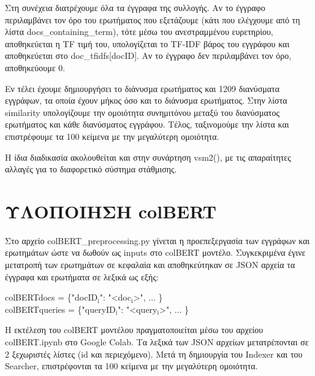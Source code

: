 ﻿\documentclass[12pt]{report}
\begin{document}
            Στη συνέχεια διατρέχουμε όλα τα έγγραφα της συλλογής. Αν το έγγραφο περιλαμβάνει τον όρο του ερωτήματος που εξετάζουμε (κάτι που ελέγχουμε από τη λίστα {\fontCode\small docs\_containing\_term}),
            τότε μέσω του ανεστραμμένου ευρετηρίου, αποθηκεύεται η TF τιμή του, υπολογίζεται το TF-IDF βάρος του εγγράφου και αποθηκεύεται στο {\fontCode\small doc\_tfidfs[docID]}.
            Αν το έγγραφο δεν περιλαμβάνει τον όρο, αποθηκεύουμε 0.

            \begin{graycomment}
                \fontCode\footnotesize doc\_ifidf\(_{\textit{\fontCode\hspace{2pt}len(doc\_collection)}}}\)\ = \{'000001': [0, 0, 0.0, 1.76, 1.5]_{\textit{\fontCode len(query)}}} \(\ldots\)\}
            \end{graycomment}

            Εν τέλει έχουμε δημιουργήσει το διάνυσμα ερωτήματος και 1209 διανύσματα εγγράφων, τα οποία έχουν μήκος όσο και το διάνυσμα ερωτήματος. Στην λίστα {\fontCode\small similarity}
            υπολογίζουμε την ομοιότητα συνημιτόνου μεταξύ του διανύσματος ερωτήματος και κάθε διανύσματος εγγράφου. Τέλος, ταξινομούμε την λίστα και επιστρέφουμε τα 100 κείμενα με την μεγαλύτερη ομοιότητα.

            Η ίδια διαδικασία ακολουθείται και στην συνάρτηση {\fontCode\small vsm2()}, με τις απαραίτητες αλλαγές για το διαφορετικό σύστημα στάθμισης.

        \section{ΥΛΟΠΟΙΗΣΗ colBERT}

            Στο αρχείο {\fontCode\small colBERT\_preprocessing.py} γίνεται η προεπεξεργασία των εγγράφων και ερωτημάτων ώστε να δωθούν ως inputs στο colBERT μοντέλο.
            Συγκεκριμένα έγινε μετατροπή των ερωτημάτων σε κεφαλαία και αποθηκεύτηκαν σε JSON αρχεία τα έγγραφα και ερωτήματα σε λεξικά ως εξής:

            \begin{graycomment}
                \fontCode\footnotesize colBERTdocs = \{"docID\(_\text{i}\)": "<doc\(_\text{i}\)>", \(\ldots\) \} \\
                \fontCode\footnotesize colBERTqueries = \{"queryID\(_\text{i}\)": "<query\(_\text{i}\)>", \(\ldots\) \}
            \end{graycomment}

            Η εκτέλεση του colBERT μοντέλου πραγματοποιείται μέσω του αρχείου {\fontCode\small colBERT.ipynb} στο Google Colab.
            Τα λεξικά των JSON αρχείων μετατρέπονται σε 2 ξεχωριστές λίστες (id και περιεχόμενο). Μετά τη δημιουργία του Indexer και του Searcher,
            επιστρέφονται τα 100 κείμενα με την μεγαλύτερη ομοιότητα.
\end{document}
